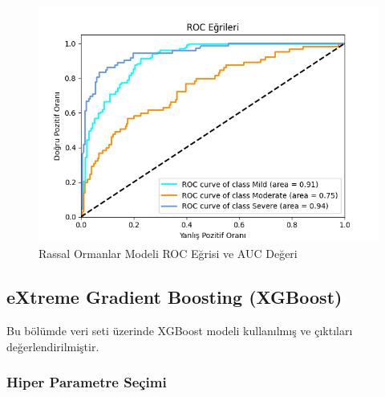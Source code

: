 \documentclass[12pt,twoside]{deuthesis}
\begin{document}
\begin{figure}

{\centering \includegraphics[width=1.05\linewidth,height=0.6\textheight]{figure/roc_curve_RandomForestClassifier} 

}

\caption{Rassal Ormanlar Modeli ROC Eğrisi ve AUC Değeri}\label{fig:unnamed-chunk-28}
\end{figure}
\hypertarget{mult_xgb}{%
\subsection{eXtreme Gradient Boosting (XGBoost)}\label{mult_xgb}}

Bu bölümde veri seti üzerinde XGBoost modeli kullanılmış ve çıktıları değerlendirilmiştir.

\hypertarget{hiper-parametre-seuxe7imi-2}{%
\subsubsection{Hiper Parametre Seçimi}\label{hiper-parametre-seuxe7imi-2}}
\end{document}
